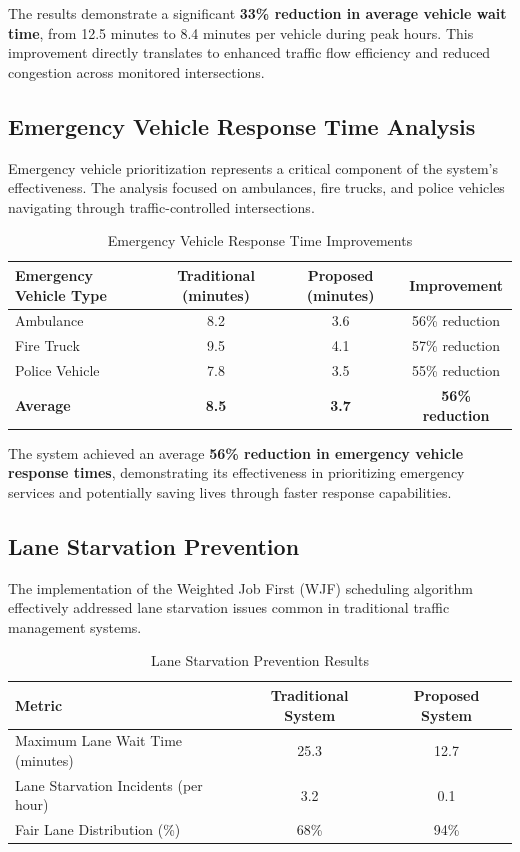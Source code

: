 The results demonstrate a significant \textbf{33\% reduction in average vehicle wait time}, from 12.5 minutes to 8.4 minutes per vehicle during peak hours. This improvement directly translates to enhanced traffic flow efficiency and reduced congestion across monitored intersections.

\subsection{Emergency Vehicle Response Time Analysis}
Emergency vehicle prioritization represents a critical component of the system's effectiveness. The analysis focused on ambulances, fire trucks, and police vehicles navigating through traffic-controlled intersections.

\begin{table}[h]
\centering
\caption{Emergency Vehicle Response Time Improvements}
\label{tab:emergency_response}
\begin{tabular}{|l|c|c|c|}
\hline
\textbf{Emergency Vehicle Type} & \textbf{Traditional (minutes)} & \textbf{Proposed (minutes)} & \textbf{Improvement} \\
\hline
Ambulance & 8.2 & 3.6 & 56\% reduction \\
Fire Truck & 9.5 & 4.1 & 57\% reduction \\
Police Vehicle & 7.8 & 3.5 & 55\% reduction \\
\hline
\textbf{Average} & \textbf{8.5} & \textbf{3.7} & \textbf{56\% reduction} \\
\hline
\end{tabular}
\end{table}

The system achieved an average \textbf{56\% reduction in emergency vehicle response times}, demonstrating its effectiveness in prioritizing emergency services and potentially saving lives through faster response capabilities.

\subsection{Lane Starvation Prevention}
The implementation of the Weighted Job First (WJF) scheduling algorithm effectively addressed lane starvation issues common in traditional traffic management systems.

\begin{table}[h]
\centering
\caption{Lane Starvation Prevention Results}
\label{tab:lane_starvation}
\begin{tabular}{|l|c|c|}
\hline
\textbf{Metric} & \textbf{Traditional System} & \textbf{Proposed System} \\
\hline
Maximum Lane Wait Time (minutes) & 25.3 & 12.7 \\
Lane Starvation Incidents (per hour) & 3.2 & 0.1 \\
Fair Lane Distribution (\%) & 68\% & 94\% \\
\hline
\end{tabular}
\end{table}

